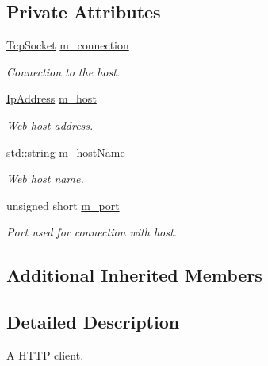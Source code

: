 \subsection*{Private Attributes}
\begin{DoxyCompactItemize}
\item 
\mbox{\label{classsf_1_1_http_aa51e5fe5f6b85b2057906f762241ed4f}} 
\mbox{\hyperlink{classsf_1_1_tcp_socket}{Tcp\+Socket}} \mbox{\hyperlink{classsf_1_1_http_aa51e5fe5f6b85b2057906f762241ed4f}{m\+\_\+connection}}
\begin{DoxyCompactList}\small\item\em Connection to the host. \end{DoxyCompactList}\item 
\mbox{\label{classsf_1_1_http_ae4504e74ccaa6afb696f431dc438f794}} 
\mbox{\hyperlink{classsf_1_1_ip_address}{Ip\+Address}} \mbox{\hyperlink{classsf_1_1_http_ae4504e74ccaa6afb696f431dc438f794}{m\+\_\+host}}
\begin{DoxyCompactList}\small\item\em Web host address. \end{DoxyCompactList}\item 
\mbox{\label{classsf_1_1_http_a4a1ab171a8fa06e0428ec80c4a80891a}} 
std\+::string \mbox{\hyperlink{classsf_1_1_http_a4a1ab171a8fa06e0428ec80c4a80891a}{m\+\_\+host\+Name}}
\begin{DoxyCompactList}\small\item\em Web host name. \end{DoxyCompactList}\item 
\mbox{\label{classsf_1_1_http_a3adcf3462408aa990c9737425bf320a9}} 
unsigned short \mbox{\hyperlink{classsf_1_1_http_a3adcf3462408aa990c9737425bf320a9}{m\+\_\+port}}
\begin{DoxyCompactList}\small\item\em Port used for connection with host. \end{DoxyCompactList}\end{DoxyCompactItemize}
\subsection*{Additional Inherited Members}


\subsection{Detailed Description}
A H\+T\+TP client. 

